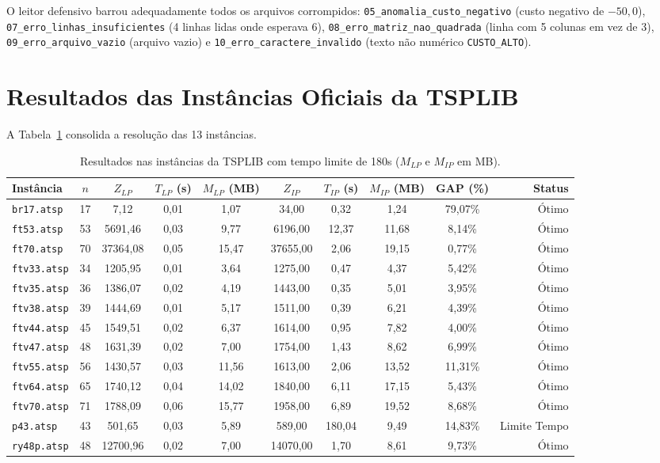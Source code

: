 \documentclass[10pt,a4paper]{article}
\begin{document}
\noindent O leitor defensivo barrou adequadamente todos os arquivos corrompidos: \texttt{05\_anomalia\_custo\_negativo} (custo negativo de $-50,0$), \texttt{07\_erro\_linhas\_insuficientes} (4 linhas lidas onde esperava 6), \texttt{08\_erro\_matriz\_nao\_quadrada} (linha com 5 colunas em vez de 3), \texttt{09\_erro\_arquivo\_vazio} (arquivo vazio) e \texttt{10\_erro\_caractere\_invalido} (texto não numérico \texttt{CUSTO\_ALTO}).

\section{Resultados das Instâncias Oficiais da TSPLIB}
A Tabela~\ref{tab:tsplib} consolida a resolução das 13 instâncias.

\begin{table}[H]
\centering
\scriptsize
\setlength{\tabcolsep}{3.5pt}
\caption{Resultados nas instâncias da TSPLIB com tempo limite de 180s ($M_{LP}$ e $M_{IP}$ em MB).}
\label{tab:tsplib}
\begin{tabular}{lccccccccr}
\toprule
Instância & $n$ & $Z_{LP}$ & $T_{LP}$ (s) & $M_{LP}$ (MB) & $Z_{IP}$ & $T_{IP}$ (s) & $M_{IP}$ (MB) & GAP (\%) & Status \\
\midrule
\texttt{br17.atsp} & 17 & 7,12 & 0,01 & 1,07 & 34,00 & 0,32 & 1,24 & 79,07\% & Ótimo \\
\texttt{ft53.atsp} & 53 & 5691,46 & 0,03 & 9,77 & 6196,00 & 12,37 & 11,68 & 8,14\% & Ótimo \\
\texttt{ft70.atsp} & 70 & 37364,08 & 0,05 & 15,47 & 37655,00 & 2,06 & 19,15 & 0,77\% & Ótimo \\
\texttt{ftv33.atsp} & 34 & 1205,95 & 0,01 & 3,64 & 1275,00 & 0,47 & 4,37 & 5,42\% & Ótimo \\
\texttt{ftv35.atsp} & 36 & 1386,07 & 0,02 & 4,19 & 1443,00 & 0,35 & 5,01 & 3,95\% & Ótimo \\
\texttt{ftv38.atsp} & 39 & 1444,69 & 0,01 & 5,17 & 1511,00 & 0,39 & 6,21 & 4,39\% & Ótimo \\
\texttt{ftv44.atsp} & 45 & 1549,51 & 0,02 & 6,37 & 1614,00 & 0,95 & 7,82 & 4,00\% & Ótimo \\
\texttt{ftv47.atsp} & 48 & 1631,39 & 0,02 & 7,00 & 1754,00 & 1,43 & 8,62 & 6,99\% & Ótimo \\
\texttt{ftv55.atsp} & 56 & 1430,57 & 0,03 & 11,56 & 1613,00 & 2,06 & 13,52 & 11,31\% & Ótimo \\
\texttt{ftv64.atsp} & 65 & 1740,12 & 0,04 & 14,02 & 1840,00 & 6,11 & 17,15 & 5,43\% & Ótimo \\
\texttt{ftv70.atsp} & 71 & 1788,09 & 0,06 & 15,77 & 1958,00 & 6,89 & 19,52 & 8,68\% & Ótimo \\
\texttt{p43.atsp} & 43 & 501,65 & 0,03 & 5,89 & 589,00 & 180,04 & 9,49 & 14,83\% & Limite Tempo \\
\texttt{ry48p.atsp} & 48 & 12700,96 & 0,02 & 7,00 & 14070,00 & 1,70 & 8,61 & 9,73\% & Ótimo \\
\bottomrule
\end{tabular}
\end{table}
\end{document}
